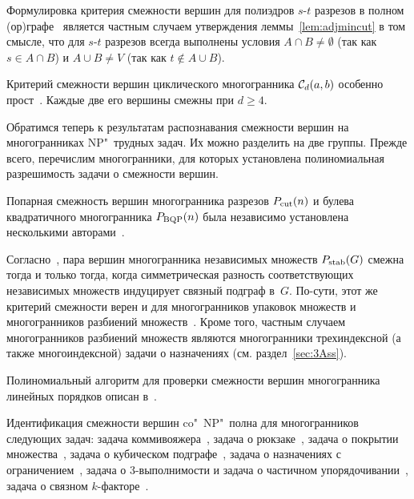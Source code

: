 Формулировка критерия смежности вершин для полиэдров $s$-$t$ разрезов в полном (ор)графе~\cite{Skutella:2010} является частным случаем утверждения леммы~\ref{lem:adjmincut} в том смысле,
что для $s$-$t$ разрезов всегда выполнены условия $A \cap B \ne \emptyset$ (так как  $s \in A \cap B$) и $A \cup B \ne V$ (так как $t \notin A \cup B$).

Критерий смежности вершин циклического многогранника ${\mathcal C}_d(a,b)$ особенно прост~\cite{Gale:1963}. Каждые две его вершины смежны при $d \ge 4$.

Обратимся теперь к результатам распознавания смежности вершин на многогранниках NP"~трудных задач.
Их можно разделить на две группы.
Прежде всего, перечислим многогранники, для которых установлена полиномиальная разрешимость задачи о смежности вершин.

Попарная смежность вершин многогранника разрезов $P_{\textup{cut}}(n)$ и булева квадратичного многогранника $P_{\textup{BQP}}(n)$ была независимо установлена несколькими авторами~\cite{Bondarenko:1987,Beloshevskii:1986,Barahona:1986,Padberg:1989}.


Согласно~\cite{Chvatal:1975}, пара вершин многогранника независимых множеств $P_{\textup{stab}}(G)$ смежна тогда и только тогда, когда симметрическая разность соответствующих независимых множеств индуцирует связный подграф в~$G$.
По-сути, этот же критерий смежности верен и для многогранников упаковок множеств и многогранников разбиений множеств~\cite{Ikura:1985}.
Кроме того, частным случаем многогранников разбиений множеств являются многогранники трехиндексной (а также многоиндексной) задачи о назначениях
(см. раздел~\ref{sec:3Ass}).

Полиномиальный алгоритм для проверки смежности вершин многогранника линейных порядков описан в~\cite{Young:1978}.

Идентификация смежности вершин co"~NP"~полна для многогранников следующих задач: задача коммивояжера~\cite{Papadimitriou:1978}, задача о рюкзаке~\cite{Chung:1980, Geist:1992, Matsui:1995}, 
задача о покрытии множества~\cite{Matsui:1995}, 
задача о кубическом подграфе~\cite{Bondarenko:1996},
задача о назначениях с ограничением~\cite{Alfakih:1998}, 
задача о 3-выполнимости
и задача о частичном упорядочивании~\cite{Fiorini:2003},
задача о связном $k$-факторе~\cite{Simanchev:2018}.


